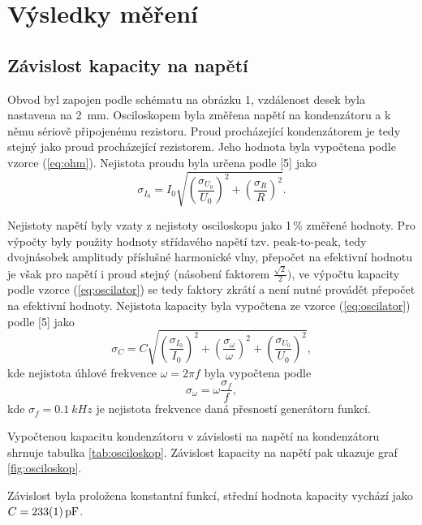 \documentclass{../concepts/prepareprotokol} %
\begin{document}
\section{Výsledky měření}
\subsection{Závislost kapacity na napětí}

Obvod byl zapojen podle schématu na obrázku 1, vzdálenost desek byla nastavena na \SI{2}{mm}. Osciloskopem byla změřena napětí na kondenzátoru a k němu sériově připojenému rezistoru. Proud procházející kondenzátorem je tedy stejný jako proud procházející rezistorem. Jeho hodnota byla vypočtena podle vzorce (\ref{eq:ohm}). Nejistota proudu byla určena podle [5] jako
\begin{equation} \label{eq:sigmai0}
    \sigma_{I_0} = I_0 \sqrt{\left(\frac{\sigma_{U_0}}{U_0}\right)^2 + 
    \left(\frac{\sigma_R}{R}\right)^2} .
\end{equation}

Nejistoty napětí byly vzaty z nejistoty osciloskopu jako 1\,\% změřené hodnoty. Pro výpočty byly použity hodnoty střídavého napětí tzv. peak-to-peak, tedy dvojnásobek amplitudy příslušné harmonické vlny, 
přepočet na efektivní hodnotu je však pro napětí i proud stejný (násobení faktorem $\frac{\sqrt{2}}{2})$, ve výpočtu kapacity podle vzorce (\ref{eq:oscilator}) se tedy faktory zkrátí a není nutné provádět přepočet na efektivní hodnoty. Nejistota kapacity byla vypočtena ze vzorce (\ref{eq:oscilator}) podle [5] jako
\begin{equation}
    \sigma_C = C \sqrt{\left(\frac{\sigma_{I_0}}{I_0}\right)^2 + 
    \left(\frac{\sigma_\omega}{\omega}\right)^2 + \left(\frac{\sigma_{U_0}}{U_0}\right)^2} ,
\end{equation}
kde nejistota úhlové frekvence $\omega = 2\pi f$ byla vypočtena podle 
\begin{equation}
    \sigma_\omega = \omega \frac{\sigma_f}{f} ,
\end{equation}
kde $\sigma_f = \SI{0.1}{kHz}$ je nejistota frekvence daná přesností generátoru funkcí.

Vypočtenou kapacitu kondenzátoru v závislosti na napětí na kondenzátoru shrnuje tabulka \ref{tab:osciloskop}. Závislost kapacity na napětí pak ukazuje graf \ref{fig:osciloskop}.

Závislost byla proložena konstantní funkcí, střední hodnota kapacity vychází jako $C = \SI{233 \pm 1}{pF}$.
\end{document}
